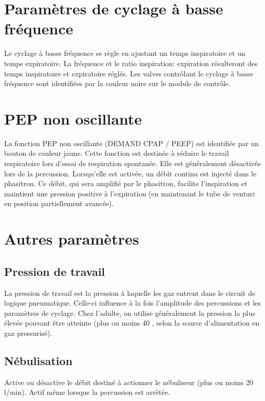 \section{Paramètres de cyclage à basse fréquence}

Le cyclage à basse fréquence se règle en ajustant un temps
	inspiratoire et un temps expiratoire.  La fréquence et le ratio
	inspiration: expiration résulteront des temps inspiratoire et
	expiratoire réglés. Les valves contrôlant le cyclage à basse
	fréquence sont identifiées par la couleur noire sur le module de
	contrôle.

\section{PEP non oscillante}

La fonction PEP non oscillante (DEMAND CPAP / PEEP) est identifiée par
	un bouton de couleur jaune.  Cette fonction est destinée à réduire
	le travail respiratoire lors d'essai de respiration spontanée. Elle
	est généralement désactivée lors de la percussion. Lorsqu'elle est
	activée, un débit continu est injecté dans le phasitron. Ce débit,
	qui sera amplifié par le phasitron, facilite l’inspiration et
	maintient une pression positive à l'expiration (en maintenant le
	tube de venturi en position partiellement avancée).  

\section{Autres paramètres}

\subsection{Pression de travail}

La pression de travail est la pression à laquelle les gaz entrent dans
	le circuit de logique pneumatique. Celle-ci influence à la fois
	l'amplitude des percussions et les paramètres de cyclage. Chez
	l'adulte, on utilise généralement la pression la plus élevée pouvant
	être atteinte (plus ou moins 40 \psi, selon la source d'alimentation
	en gaz pressurisé).


\subsection{Nébulisation}

Active ou désactive le débit destiné à actionner le nébuliseur (plus
ou moins 20 l/min). Actif même lorsque la percussion est arrêtée. 

